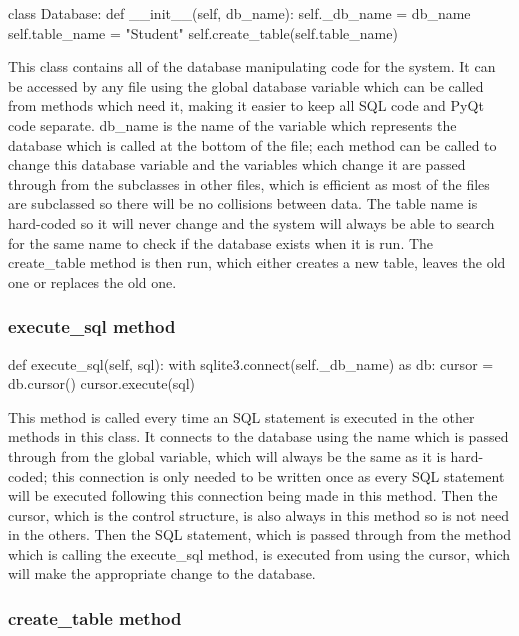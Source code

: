 \begin{python}
class Database:
    def __init__(self, db_name):
        self._db_name = db_name
        self.table_name = "Student"
        self.create_table(self.table_name)
\end{python}

This class contains all of the database manipulating code for the system. It can be accessed by any file using the global database variable which can be called from methods which need it, making it easier to keep all SQL code and PyQt code separate. db\_name is the name of the variable which represents the database which is called at the bottom of the file; each method can be called to change this database variable and the variables which change it are passed through from the subclasses in other files, which is efficient as most of the files are subclassed so there will be no collisions between data. The table name is hard-coded so it will never change and the system will always be able to search for the same name to check if the database exists when it is run. The create\_table method is then run, which either creates a new table, leaves the old one or replaces the old one.

\subsubsection{execute\_sql method}

\begin{python}
def execute_sql(self, sql):
     with sqlite3.connect(self._db_name) as db:
         cursor = db.cursor()
         cursor.execute(sql)
\end{python}

This method is called every time an SQL statement is executed in the other methods in this class. It connects to the database using the name which is passed through from the global variable, which will always be the same as it is hard-coded; this connection is only needed to be written once as every SQL statement will be executed following this connection being made in this method. Then the cursor, which is the control structure, is also always in this method so is not need in the others. Then the SQL statement, which is passed through from the method which is calling the execute\_sql method, is executed from using the cursor, which will make the appropriate change to the database.

\subsubsection{create\_table method}

